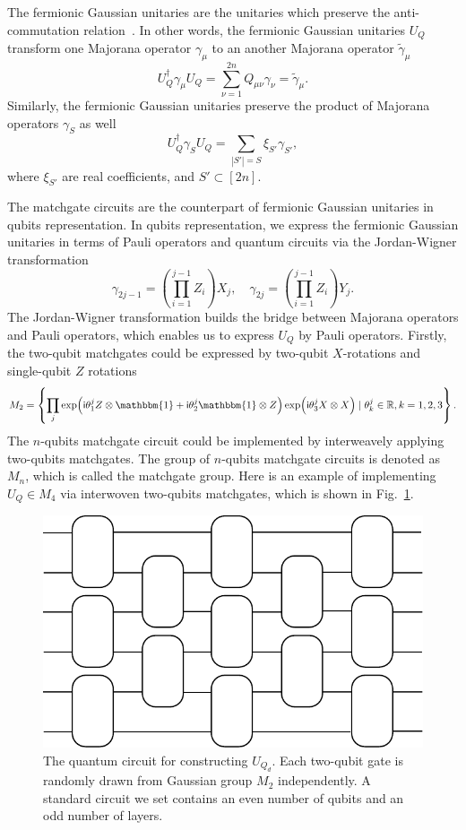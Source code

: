 \documentclass{article}
\newcommand{\ii}{\mathsf{i}}
\begin{document}
The fermionic Gaussian unitaries are the unitaries which preserve the anti-commutation relation~\cite{hackl2021bosonic, weedbrook2012gaussian,wang2007quantum}. 
In other words, the fermionic Gaussian unitaries $U_Q$ transform one Majorana operator $\gamma_\mu$ to an another Majorana operator $\tilde{\gamma}_\mu$
\begin{equation}
 U_Q^{\dagger} \gamma_\mu U_Q=\sum_{\nu=1}^{2 n} Q_{\mu \nu} \gamma_\nu = \tilde{\gamma}_\mu.
\end{equation}
Similarly, the fermionic Gaussian unitaries preserve the product of Majorana operators $\gamma_S$ as well
\begin{equation}
 U_Q^{\dagger} \gamma_S U_Q=\sum_{|S'| = S} \xi_{S'} \gamma_{S'},
\end{equation}
where $\xi_{S'}$ are real coefficients, and $S' \subset [2n]$.

The matchgate circuits are the counterpart of fermionic Gaussian unitaries in qubits representation. In qubits representation, we express the fermionic Gaussian unitaries in terms of Pauli operators and quantum circuits via the Jordan-Wigner transformation
\begin{equation}
    \gamma_{2 j-1}=\left(\prod_{i=1}^{j-1} Z_i\right) X_j, \quad \gamma_{2 j}=\left(\prod_{i=1}^{j-1} Z_i\right) Y_j.
\end{equation}
The Jordan-Wigner transformation builds the bridge between Majorana operators and Pauli operators, which enables us to express $U_Q$ by Pauli operators. Firstly, the two-qubit matchgates could be expressed by two-qubit $X$-rotations and single-qubit $Z$ rotations
\begin{equation}
    M_2 = \left\{\prod_j\exp(\ii \theta_1^j  Z\otimes \mathbbm{1} + \ii \theta_2^j  \mathbbm{1}\otimes Z)\exp(\ii \theta_3^j  X\otimes X)\mid \theta^j_k \in \mathbb{R}, k = 1,2,3 \right\}.
\end{equation}
The $n$-qubits matchgate circuit could be implemented by interweavely applying two-qubits matchgates. The group of $n$-qubits matchgate circuits is denoted as $M_n$, which is called the matchgate group. Here is an example of implementing $U_Q\in M_4$ via interwoven two-qubits matchgates, which is shown in Fig.~\ref{fig:1}.

\begin{figure}
    \centering
    \includegraphics[width=0.5\linewidth]{figures/main/matchgate.pdf}
    \caption{The quantum circuit for constructing $U_{Q_d}$. Each two-qubit gate is randomly drawn from Gaussian group $M_2$ independently. A standard circuit we set contains an even number of qubits and an odd number of layers.}
    \label{fig:1}
\end{figure}
\end{document}
